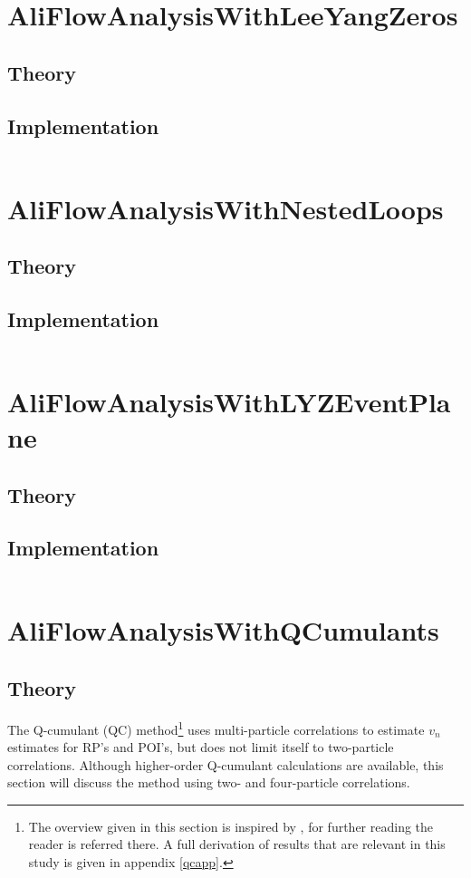 \documentclass[a4paper]{book}
\numberwithin{equation}{subsection}
\begin{document}
\section{AliFlowAnalysisWithLeeYangZeros}
\subsection{Theory}
\subsection{Implementation}
\begin{lstlisting}

\end{lstlisting}


\section{AliFlowAnalysisWithNestedLoops}
\subsection{Theory}
\subsection{Implementation}
\begin{lstlisting}

\end{lstlisting}


\section{AliFlowAnalysisWithLYZEventPlane}
\subsection{Theory}
\subsection{Implementation}
\begin{lstlisting}

\end{lstlisting}


\section{AliFlowAnalysisWithQCumulants}

	\label{qvc}
	\subsection{Theory}
	The Q-cumulant (QC) method\footnote{The overview given in this section is inspired by \cite{bilandzic-2011-83}, for further reading the reader is referred there. A full derivation of results that are relevant in this study is given in appendix \ref{qcapp}.} uses multi-particle correlations to estimate $v_n$ estimates for RP's and POI's, but does not limit itself to two-particle correlations. Although higher-order Q-cumulant calculations are available, this section will discuss the method using two- and four-particle correlations. 
		
\end{document}
